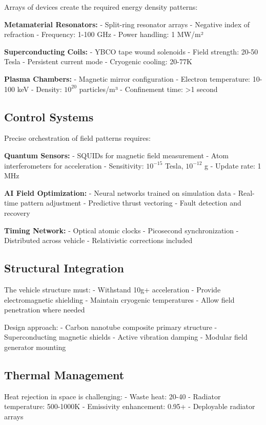 \documentclass[12pt,letterpaper]{book}
\theoremstyle{definition}
\theoremstyle{plain}
\theoremstyle{remark}
\begin{document}
{{{{{Arrays of devices create the required energy density patterns:

\textbf{Metamaterial Resonators:}
- Split-ring resonator arrays
- Negative index of refraction
- Frequency: 1-100 GHz
- Power handling: 1 MW/m²

\textbf{Superconducting Coils:}
- YBCO tape wound solenoids
- Field strength: 20-50 Tesla
- Persistent current mode
- Cryogenic cooling: 20-77K

\textbf{Plasma Chambers:}
- Magnetic mirror configuration
- Electron temperature: 10-100 keV
- Density: $10^{20}$ particles/m³
- Confinement time: >1 second

\subsection{Control Systems}

Precise orchestration of field patterns requires:

\textbf{Quantum Sensors:}
- SQUIDs for magnetic field measurement
- Atom interferometers for acceleration
- Sensitivity: $10^{-15}$ Tesla, $10^{-12}$ g
- Update rate: 1 MHz

\textbf{AI Field Optimization:}
- Neural networks trained on simulation data
- Real-time pattern adjustment
- Predictive thrust vectoring
- Fault detection and recovery

\textbf{Timing Network:}
- Optical atomic clocks
- Picosecond synchronization
- Distributed across vehicle
- Relativistic corrections included

\subsection{Structural Integration}

The vehicle structure must:
- Withstand 10g+ acceleration
- Provide electromagnetic shielding
- Maintain cryogenic temperatures
- Allow field penetration where needed

Design approach:
- Carbon nanotube composite primary structure
- Superconducting magnetic shields
- Active vibration damping
- Modular field generator mounting

\subsection{Thermal Management}

Heat rejection in space is challenging:
- Waste heat: 20-40%
- Radiator temperature: 500-1000K
- Emissivity enhancement: 0.95+
- Deployable radiator arrays

}}}}}
\end{document}
